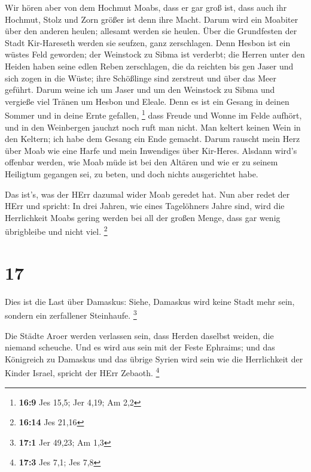  Wir hören aber von dem Hochmut Moabs, dass er gar groß ist,
dass auch ihr Hochmut, Stolz und Zorn größer ist denn ihre Macht.
 Darum wird ein Moabiter über den anderen heulen; allesamt
werden sie heulen. Über die Grundfesten der Stadt Kir-Hareseth werden
sie seufzen, ganz zerschlagen.  Denn Hesbon ist ein wüstes
Feld geworden; der Weinstock zu Sibma ist verderbt; die Herren unter den
Heiden haben seine edlen Reben zerschlagen, die da reichten bis gen
Jaser und sich zogen in die Wüste; ihre Schößlinge sind zerstreut und
über das Meer geführt.  Darum weine ich um Jaser und um den
Weinstock zu Sibma und vergieße viel Tränen um Hesbon und Eleale. Denn
es ist ein Gesang in deinen Sommer und in deine Ernte gefallen,
\footnote{\textbf{16:9} Jes 15,5; Jer 4,19; Am 2,2}  dass
Freude und Wonne im Felde aufhört, und in den Weinbergen jauchzt noch
ruft man nicht. Man keltert keinen Wein in den Keltern; ich habe dem
Gesang ein Ende gemacht.  Darum rauscht mein Herz über Moab
wie eine Harfe und mein Inwendiges über Kir-Heres.  Alsdann
wird's offenbar werden, wie Moab müde ist bei den Altären und wie er zu
seinem Heiligtum gegangen sei, zu beten, und doch nichts ausgerichtet
habe.

 Das ist's, was der HErr dazumal wider Moab geredet hat.
 Nun aber redet der HErr und spricht: In drei Jahren, wie
eines Tagelöhners Jahre sind, wird die Herrlichkeit Moabs gering werden
bei all der großen Menge, dass gar wenig übrigbleibe und nicht viel.
\footnote{\textbf{16:14} Jes 21,16}

\hypertarget{section-8}{%
\section{17}\label{section-8}}

 Dies ist die Last über Damaskus: Siehe, Damaskus wird keine
Stadt mehr sein, sondern ein zerfallener Steinhaufe. \footnote{\textbf{17:1}
  Jer 49,23; Am 1,3}

 Die Städte Aroer werden verlassen sein, dass Herden
daselbst weiden, die niemand scheuche.  Und es wird aus sein
mit der Feste Ephraims; und das Königreich zu Damaskus und das übrige
Syrien wird sein wie die Herrlichkeit der Kinder Israel, spricht der
HErr Zebaoth. \footnote{\textbf{17:3} Jes 7,1; Jes 7,8}

